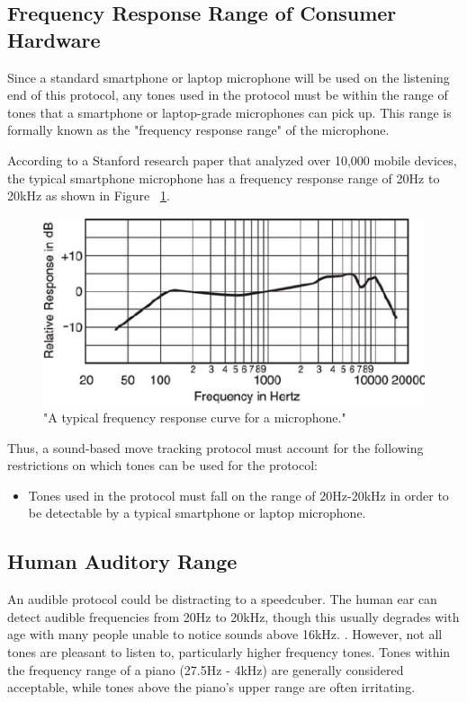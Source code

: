 \subsection{Frequency Response Range of Consumer Hardware}
\label{subsec:frequency-response-range}
Since a standard smartphone or laptop microphone will be used on the listening end of this protocol, any tones used in the protocol must be within the range of tones that a smartphone or laptop-grade microphones can pick up.
This range is formally known as the "frequency response range" of the microphone.

According to a Stanford research paper \cite{typical-mic-range} that analyzed over 10,000 mobile devices, the typical smartphone microphone has a frequency response range of 20Hz to 20kHz as shown in Figure ~\ref{fig:freq-res-range}.

\begin{figure}[h]
    \centering
    \caption{"A typical frequency response curve for a microphone." \cite{typical-mic-range}}
    \label{fig:freq-res-range}
    \includegraphics[width=.50\linewidth]{Figures/4 Protocol Design/Frequency Response Range/typical-smartphone-response-range.png}
\end{figure}

Thus, a sound-based move tracking protocol must account for the following restrictions on which tones can be used for the protocol:
\begin{itemize}
    \item Tones used in the protocol must fall on the range of 20Hz-20kHz in order to be detectable by a typical smartphone or laptop microphone.
\end{itemize}

\subsection{Human Auditory Range}
\label{subsec:human-auditory-range}
An audible protocol could be distracting to a speedcuber. 
The human ear can detect audible frequencies from 20Hz to 20kHz, though this usually degrades with age with many people unable to notice sounds above 16kHz. \cite{audible-range}.
However, not all tones are pleasant to listen to, particularly higher frequency tones.
Tones within the frequency range of a piano (27.5Hz - 4kHz) are generally considered acceptable, while tones above the piano's upper range are often irritating. \cite{piano-range}

